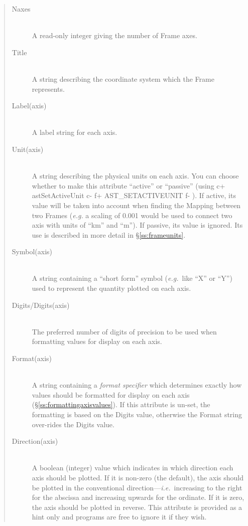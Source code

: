 \documentclass[twoside,11pt]{starlink}
\providecommand{\secref}[1]{\S\ref{#1}}
\begin{document}
\begin{quote}
\begin{description}
\item[Naxes]\mbox{}\\
A read-only integer giving the number of Frame axes.

\item[Title]\mbox{}\\
A string describing the coordinate system which the Frame represents.

\item[Label(axis)]\mbox{}\\
A label string for each axis.

\item[Unit(axis)]\mbox{}\\
A string describing the physical units on each axis. You can choose
whether to make this attribute ``active'' or ``passive'' (using
c+
astSetActiveUnit
c-
f+
AST\_SETACTIVEUNIT
f-
). If active, its value will be taken into account when finding the
Mapping between two Frames (\emph{e.g.} a scaling of 0.001 would be used
to connect two axis with units of ``km'' and ``m''). If passive, its value
is ignored. Its use is described in more detail in \secref{ss:frameunits}.

\item[Symbol(axis)]\mbox{}\\
A string containing a ``short form'' symbol (\emph{e.g.}\ like ``X''
or ``Y'') used to represent the quantity plotted on each axis.

\item[Digits/Digits(axis)]\mbox{}\\
The preferred number of digits of precision to be used when formatting
values for display on each axis.

\item[Format(axis)]\mbox{}\\
A string containing a \emph{format specifier} which determines exactly
how values should be formatted for display on each axis
(\secref{ss:formattingaxisvalues}). If this attribute is un-set, the
formatting is based on the Digits value, otherwise the Format string
over-rides the Digits value.

\item[Direction(axis)]\mbox{}\\
A boolean (integer) value which indicates in which direction each axis
should be plotted. If it is non-zero (the default), the axis should be
plotted in the conventional direction---\emph{i.e.}\ increasing to the
right for the abscissa and increasing upwards for the ordinate. If it
is zero, the axis should be plotted in reverse.  This attribute is
provided as a hint only and programs are free to ignore it if they
wish.


\end{description}
\end{quote}
\end{document}
